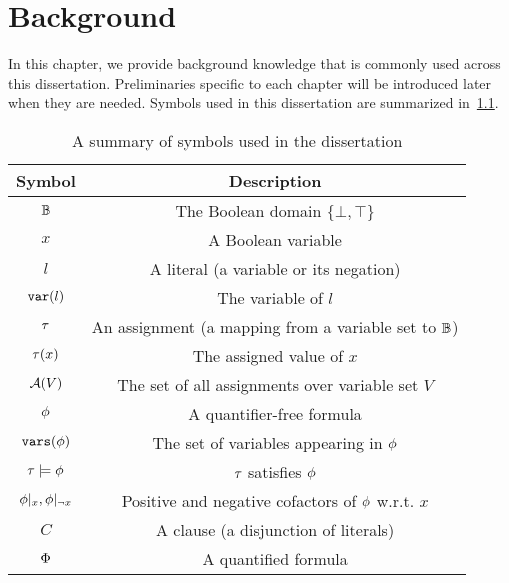 \chapter{Background}
\label{chap:background}

In this chapter, we provide background knowledge that is commonly used across this dissertation.
Preliminaries specific to each chapter will be introduced later when they are needed.
Symbols used in this dissertation are summarized in~\cref{tbl:symbols}.

\begin{table}[t]
    \centering
    \caption{A summary of symbols used in the dissertation}
    \label{tbl:symbols}
    \begin{tabular}{c|c}
        Symbol                      & Description                                                 \\
        \hline
        $\mathbb{B}$                  & The Boolean domain $\{\bot,\top\}$                          \\
        $x$                         & A Boolean variable                                          \\
        $l$                         & A literal (a variable or its negation)                      \\
        $\mathtt{var}(l)$                    & The variable of $l$                                         \\
        $\tau$                       & An assignment (a mapping from a variable set to $\mathbb{B}$) \\
        $\tau(x)$                    & The assigned value of $x$                                   \\
        $\mathcal{A}(V)$                    & The set of all assignments over variable set $V$            \\
        $\phi$                       & A quantifier-free formula                                   \\
        $\mathtt{vars}(\phi)$                  & The set of variables appearing in $\phi$                     \\
        $\tau\models\phi$             & $\tau$ satisfies $\phi$                                       \\
        $\phi|_{x},\phi|_{\lnot x}$ & Positive and negative cofactors of $\phi$ w.r.t. $x$         \\
        $C$                         & A clause (a disjunction of literals)                        \\
        $\Phi$                       & A quantified formula                                        \\
    \end{tabular}
\end{table}




